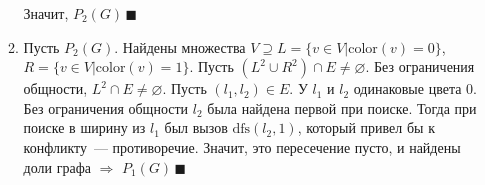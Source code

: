 \documentclass[a4paper]{article}
\begin{document}
\begin{enumerate}
\begin{enumerate}
\newline
Значит, $P_2(G)\,\blacksquare$
\item Пусть $P_2(G)$. Найдены множества $V\supseteq L=\{v\in V\big| \mbox{color}(v)=0\}$, $R=\{v\in V\big| \mbox{color}(v)=1\}$. Пусть $(L^2\cup R^2)\cap E\neq\varnothing$. Без ограничения общности, $L^2\cap E\neq\varnothing$. Пусть $(l_1,l_2)\in E$. У $l_1$ и $l_2$ одинаковые цвета $0$. Без ограничения общности $l_2$ была найдена первой при поиске. Тогда при поиске в ширину из $l_1$ был вызов $\mbox{dfs}(l_2,1)$, который привел бы к конфликту~--- противоречие. Значит, это пересечение пусто, и найдены доли графа $\Rightarrow$ $P_1(G)\,\blacksquare$
\end{enumerate}
\end{enumerate}
\end{document}
